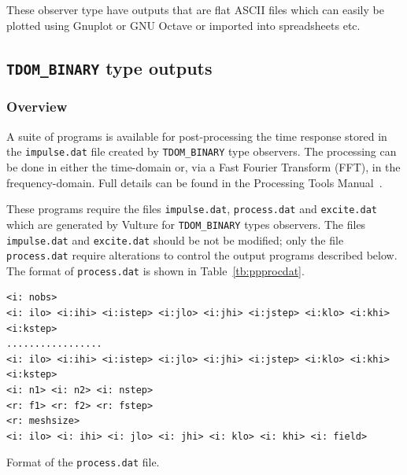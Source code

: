 \documentclass[onecolumn,a4paper]{article}
\numberwithin{equation}{section}
\begin{document}
These observer type have outputs that are flat ASCII files which can easily be plotted using Gnuplot
or GNU Octave or imported into spreadsheets etc.

\subsection{\texttt{TDOM\_BINARY} type outputs}
\label{sc:binarypp}

\subsubsection{Overview}

A suite of programs is available for post-processing the time response stored in the \texttt{impulse.dat} 
file created by \texttt{TDOM\_BINARY} type observers. The processing can be done in either the time-domain 
or, via a Fast Fourier Transform (FFT), in the frequency-domain. Full details can be found in the Processing 
Tools Manual~\cite{procman}.

These programs require the files \texttt{impulse.dat}, \texttt{process.dat} and \texttt{excite.dat} which are 
generated by Vulture for \texttt{TDOM\_BINARY} types observers. The files \texttt{impulse.dat} 
and \texttt{excite.dat} should be not be modified; only the file \texttt{process.dat} require alterations to control
the output programs described below. The format of \texttt{process.dat} is shown in Table~\ref{tb:ppprocdat}.

\begin{table}[th]
{\footnotesize
\begin{Verbatim}[frame=single]
<i: nobs>
<i: ilo> <i:ihi> <i:istep> <i:jlo> <i:jhi> <i:jstep> <i:klo> <i:khi> <i:kstep>
.................
<i: ilo> <i:ihi> <i:istep> <i:jlo> <i:jhi> <i:jstep> <i:klo> <i:khi> <i:kstep>
<i: n1> <i: n2> <i: nstep>
<r: f1> <r: f2> <r: fstep>
<r: meshsize>
<i: ilo> <i: ihi> <i: jlo> <i: jhi> <i: klo> <i: khi> <i: field>
\end{Verbatim}
}
\caption{\label{tb:ppprocdat} Format of the \texttt{process.dat} file.}
\end{table}
\end{document}
